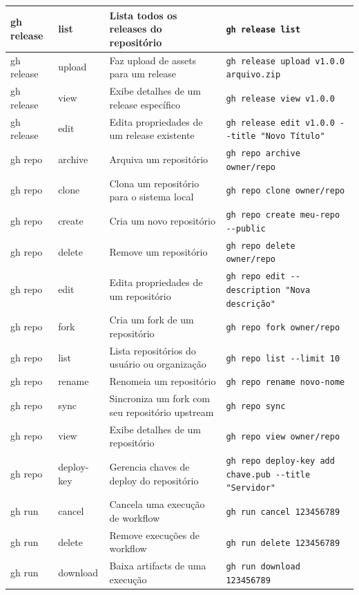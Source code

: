 \begin{longtable}{|p{2cm}|p{2.3cm}|p{4cm}|p{6cm}|}
    \hline
    gh release & list & Lista todos os releases do repositório & \texttt{gh release list} \\
    \hline
    gh release & upload & Faz upload de assets para um release & \texttt{gh release upload v1.0.0 arquivo.zip} \\
    \hline
    gh release & view & Exibe detalhes de um release específico & \texttt{gh release view v1.0.0} \\
    \hline
    gh release & edit & Edita propriedades de um release existente & \texttt{gh release edit v1.0.0 -{-}title "Novo Título"} \\
    \hline
    gh repo & archive & Arquiva um repositório & \texttt{gh repo archive owner/repo} \\
    \hline
    gh repo & clone & Clona um repositório para o sistema local & \texttt{gh repo clone owner/repo} \\
    \hline
    gh repo & create & Cria um novo repositório & \texttt{gh repo create meu-repo -{-}public} \\
    \hline
    gh repo & delete & Remove um repositório & \texttt{gh repo delete owner/repo} \\
    \hline
    gh repo & edit & Edita propriedades de um repositório & \texttt{gh repo edit -{-}description "Nova descrição"} \\
    \hline
    gh repo & fork & Cria um fork de um repositório & \texttt{gh repo fork owner/repo} \\
    \hline
    gh repo & list & Lista repositórios do usuário ou organização & \texttt{gh repo list -{-}limit 10} \\
    \hline
    gh repo & rename & Renomeia um repositório & \texttt{gh repo rename novo-nome} \\
    \hline
    gh repo & sync & Sincroniza um fork com seu repositório upstream & \texttt{gh repo sync} \\
    \hline
    gh repo & view & Exibe detalhes de um repositório & \texttt{gh repo view owner/repo} \\
    \hline
    gh repo & deploy-key & Gerencia chaves de deploy do repositório & \texttt{gh repo deploy-key add chave.pub -{-}title "Servidor"} \\
    \hline
    gh run & cancel & Cancela uma execução de workflow & \texttt{gh run cancel 123456789} \\
    \hline
    gh run & delete & Remove execuções de workflow & \texttt{gh run delete 123456789} \\
    \hline
    gh run & download & Baixa artifacts de uma execução & \texttt{gh run download 123456789} \\

\end{longtable}
